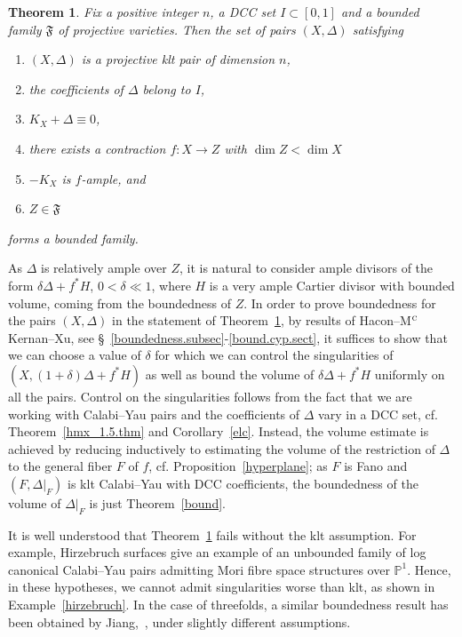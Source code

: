 \documentclass{amsart}[12pt,a4paper]
\newtheorem{theorem}{Theorem}[section]
\theoremstyle{definition}
\begin{document}
\begin{theorem} 
\label{bounded.bases}
Fix a positive integer $n$, a DCC set $I\subset [0,1]$ and a bounded family $\mathfrak{F}$ of projective varieties. Then the set of pairs $(X, \Delta)$ satisfying
\begin{enumerate}
\item 
$(X, \Delta )$ is a projective klt pair of dimension $n$,
\item 
the coefficients of $\Delta$ belong to $I$,
\item 
$K_X+\Delta \equiv 0$,
\item 
there exists a contraction $f\colon X\to Z$ with $\dim Z < \dim X$
\item 
$-K_X$ is $f$-ample, and
\item 
$Z \in \mathfrak{F}$
\end{enumerate}
forms a bounded family.
\end{theorem}

As $\Delta$ is relatively ample over $Z$, it is natural to consider ample divisors of the form $\delta\Delta + f^\ast H$, $0<\delta\ll 1$, where $H$ is a very ample Cartier divisor with bounded volume, coming from the boundedness of $Z$.
In order to prove boundedness for the pairs $(X, \Delta)$ in the statement of Theorem~\ref{bounded.bases}, by results of Hacon--M$^\textsc{c}$Kernan--Xu, see \S~\ref{boundedness.subsec}-\ref{bound.cyp.sect}, it suffices to show that we can choose a value of $\delta$ for which we can control the singularities of $(X, (1+\delta)\Delta + f^\ast H)$ as well as bound the volume of $\delta\Delta + f^\ast H$ uniformly on all the pairs.
Control on the singularities follows from the fact that we are working with Calabi--Yau pairs and the coefficients of $\Delta$ vary in a DCC set, cf. Theorem~\ref{hmx_1.5.thm} and Corollary~\ref{elc}. 
Instead, the volume estimate is achieved by reducing inductively to estimating the volume of the restriction of $\Delta$ to the general fiber $F$ of $f$, cf. Proposition~\ref{hyperplane}; 
as $F$ is Fano and $(F, \Delta|_F)$ is klt Calabi--Yau with DCC coefficients, the boundedness of the volume of $\Delta|_F$ is just Theorem~\ref{bound}.

It is well understood that Theorem~\ref{bounded.bases} fails without the klt assumption. 
For example, Hirzebruch surfaces give an example of an unbounded family of log canonical Calabi--Yau pairs admitting Mori fibre space structures over $\mathbb{P}^1$. 
Hence, in these hypotheses, we cannot admit singularities worse than klt, as shown in Example~\ref{hirzebruch}. 
In the case of threefolds, a similar boundedness result has been obtained by Jiang,~\cite{Jia15}, under slightly different assumptions.
\end{document}
